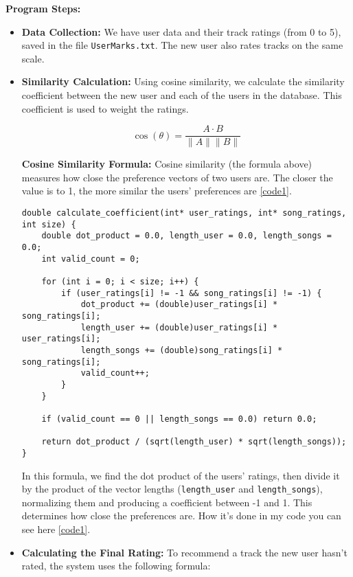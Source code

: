 \documentclass[12pt,a4paper]{article}
\begin{document}
\textbf{Program Steps:}
\begin{itemize}
    \item \textbf{Data Collection:} We have user data and their track ratings (from 0 to 5), saved in the file \texttt{UserMarks.txt}. The new user also rates tracks on the same scale.
    
    \item \textbf{Similarity Calculation:} Using cosine similarity, we calculate the similarity coefficient between the new user and each of the users in the database. This coefficient is used to weight the ratings.

    \[
    \cos(\theta) = \frac{A \cdot B}{\|A\| \|B\|}
    \]

    \textbf{Cosine Similarity Formula:} Cosine similarity (the formula above) measures how close the preference vectors of two users are. The closer the value is to 1, the more similar the users’ preferences are \autoref{code1}.


\begin{lstlisting}[label={code1}]
double calculate_coefficient(int* user_ratings, int* song_ratings, int size) {
    double dot_product = 0.0, length_user = 0.0, length_songs = 0.0;
    int valid_count = 0;

    for (int i = 0; i < size; i++) {
        if (user_ratings[i] != -1 && song_ratings[i] != -1) {
            dot_product += (double)user_ratings[i] * song_ratings[i];
            length_user += (double)user_ratings[i] * user_ratings[i];
            length_songs += (double)song_ratings[i] * song_ratings[i];
            valid_count++;
        }
    }

    if (valid_count == 0 || length_songs == 0.0) return 0.0;

    return dot_product / (sqrt(length_user) * sqrt(length_songs));
}
\end{lstlisting}



    In this formula, we find the dot product of the users' ratings, then divide it by the product of the vector lengths (\texttt{length\_user} and \texttt{length\_songs}), normalizing them and producing a coefficient between -1 and 1. This determines how close the preferences are. How it's done in my code you can see here \autoref{code1}.

    \item \textbf{Calculating the Final Rating:} To recommend a track the new user hasn’t rated, the system uses the following formula:


\end{itemize}
\end{document}
